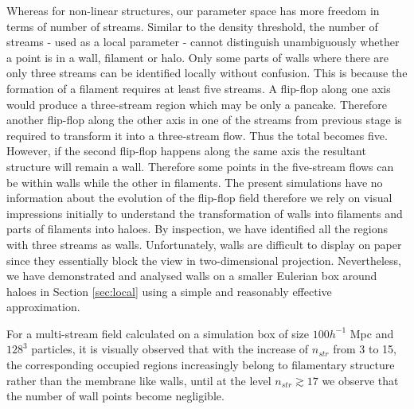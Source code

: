 Whereas for non-linear structures, our parameter space has more freedom in terms of number of streams. 
Similar to the density threshold, the number of streams - used as a local parameter - cannot distinguish unambiguously whether a point is in a wall, 
filament or halo. Only some parts of walls where there are only three streams can be identified locally without confusion. This is because the formation of a filament
requires at least five streams. A flip-flop along one axis  would produce a three-stream region which may be only a pancake. 
 Therefore  another flip-flop along the other axis in one of the streams
from previous stage is required to transform it into a three-stream flow. Thus the total becomes five. However, if the second flip-flop happens along the same axis 
the resultant structure will remain a wall. Therefore some points in the five-stream flows can be within walls while the other in filaments. The present simulations have no information about the evolution of the flip-flop field
therefore we rely on visual impressions initially to understand the transformation of walls into filaments and parts of filaments into  haloes. By inspection, we have identified all the regions with three streams as walls. Unfortunately, walls are difficult to display on paper since they essentially block the view in two-dimensional projection. Nevertheless, we have demonstrated and analysed walls on a smaller Eulerian box around haloes in Section \ref{sec:local} using a simple and reasonably effective approximation. 



For a multi-stream field calculated on a simulation box of size $100 h^{-1}$ Mpc and $128^3$ particles, it is visually observed that with the increase of $n_{str}$ from 3 to 15,  the corresponding occupied regions increasingly belong to filamentary structure rather than the membrane like walls, until at the level $n_{str}  \gtrsim 17$ we observe that the number of wall points become negligible.

